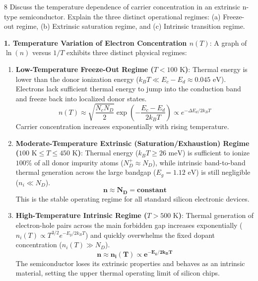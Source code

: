 \begin{theoryq}{8}
Discuss the temperature dependence of carrier concentration in an extrinsic n-type semiconductor. Explain the three distinct operational regimes: (a) Freeze-out regime, (b) Extrinsic saturation regime, and (c) Intrinsic transition regime.
\end{theoryq}
\begin{theorysol}
\textbf{1. Temperature Variation of Electron Concentration $n(T)$}:
A graph of $\ln(n)$ versus $1/T$ exhibits three distinct physical regimes:

\begin{enumerate}
    \item \textbf{Low-Temperature Freeze-Out Regime ($T < 100\text{ K}$)}:
    Thermal energy is lower than the donor ionization energy ($k_BT \ll E_c - E_d \approx 0.045\text{ eV}$).
    Electrons lack sufficient thermal energy to jump into the conduction band and freeze back into localized donor states.
    \begin{equation}
    n(T) \approx \sqrt{\frac{N_c N_D}{2}} \exp\left(-\frac{E_c - E_d}{2 k_B T}\right) \propto e^{-\Delta E_d / 2k_BT}
    \end{equation}
    Carrier concentration increases exponentially with rising temperature.

    \item \textbf{Moderate-Temperature Extrinsic (Saturation/Exhaustion) Regime ($100\text{ K} \le T \le 450\text{ K}$)}:
    Thermal energy ($k_BT \ge 26\text{ meV}$) is sufficient to ionize $100\%$ of all donor impurity atoms ($N_D^+ \approx N_D$), while intrinsic band-to-band thermal generation across the large bandgap ($E_g = 1.12\text{ eV}$) is still negligible ($n_i \ll N_D$).
    \begin{equation}
    \mathbf{n \approx N_D = \text{constant}}
    \end{equation}
    This is the stable operating regime for all standard silicon electronic devices.

    \item \textbf{High-Temperature Intrinsic Regime ($T > 500\text{ K}$)}:
    Thermal generation of electron-hole pairs across the main forbidden gap increases exponentially ($n_i(T) \propto T^{3/2}e^{-E_g/2k_BT}$) and quickly overwhelms the fixed dopant concentration ($n_i(T) \gg N_D$).
    \begin{equation}
    \mathbf{n \approx n_i(T) \propto e^{-E_g / 2k_BT}}
    \end{equation}
    The semiconductor loses its extrinsic properties and behaves as an intrinsic material, setting the upper thermal operating limit of silicon chips.
\end{enumerate}
\end{theorysol}
\vspace{4mm}

